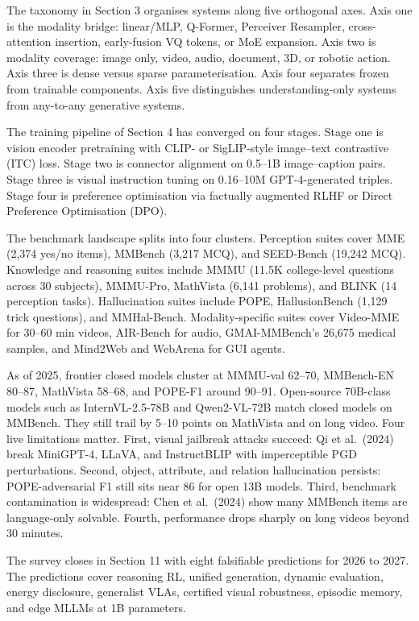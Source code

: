 The taxonomy in Section 3 organises systems along five orthogonal axes. Axis one is the modality bridge: linear/MLP, Q-Former, Perceiver Resampler, cross-attention insertion, early-fusion VQ tokens, or MoE expansion. Axis two is modality coverage: image only, video, audio, document, 3D, or robotic action. Axis three is dense versus sparse parameterisation. Axis four separates frozen from trainable components. Axis five distinguishes understanding-only systems from any-to-any generative systems.

The training pipeline of Section 4 has converged on four stages. Stage one is vision encoder pretraining with CLIP- or SigLIP-style image--text contrastive (ITC) loss. Stage two is connector alignment on 0.5--1B image--caption pairs. Stage three is visual instruction tuning on 0.16--10M GPT-4-generated triples. Stage four is preference optimisation via factually augmented RLHF or Direct Preference Optimisation (DPO).

The benchmark landscape splits into four clusters. Perception suites cover MME (2,374 yes/no items), MMBench (3,217 MCQ), and SEED-Bench (19,242 MCQ). Knowledge and reasoning suites include MMMU (11.5K college-level questions across 30 subjects), MMMU-Pro, MathVista (6,141 problems), and BLINK (14 perception tasks). Hallucination suites include POPE, HallusionBench (1,129 trick questions), and MMHal-Bench. Modality-specific suites cover Video-MME for 30--60 min videos, AIR-Bench for audio, GMAI-MMBench's 26,675 medical samples, and Mind2Web and WebArena for GUI agents.

As of 2025, frontier closed models cluster at MMMU-val 62--70, MMBench-EN 80--87, MathVista 58--68, and POPE-F1 around 90--91. Open-source 70B-class models such as InternVL-2.5-78B and Qwen2-VL-72B match closed models on MMBench. They still trail by 5--10 points on MathVista and on long video. Four live limitations matter. First, visual jailbreak attacks succeed: Qi et al.~(2024) break MiniGPT-4, LLaVA, and InstructBLIP with imperceptible PGD perturbations. Second, object, attribute, and relation hallucination persists: POPE-adversarial F1 still sits near 86 for open 13B models. Third, benchmark contamination is widespread: Chen et al.~(2024) show many MMBench items are language-only solvable. Fourth, performance drops sharply on long videos beyond 30 minutes.

The survey closes in Section 11 with eight falsifiable predictions for 2026 to 2027. The predictions cover reasoning RL, unified generation, dynamic evaluation, energy disclosure, generalist VLAs, certified visual robustness, episodic memory, and edge MLLMs at 1B parameters.

